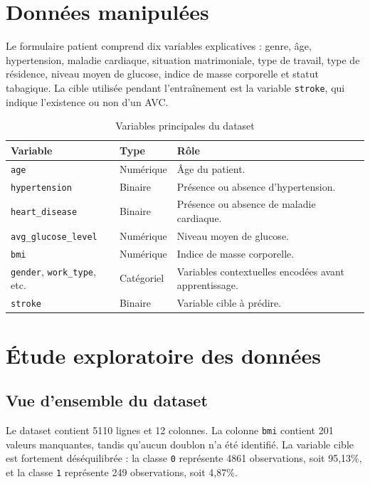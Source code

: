 \documentclass[12pt,a4paper]{report}
\begin{document}
\section{Données manipulées}
Le formulaire patient comprend dix variables explicatives : genre, âge, hypertension, maladie cardiaque, situation matrimoniale, type de travail, type de résidence, niveau moyen de glucose, indice de masse corporelle et statut tabagique. La cible utilisée pendant l'entraînement est la variable \texttt{stroke}, qui indique l'existence ou non d'un AVC.

\begin{table}[H]
\centering
\caption{Variables principales du dataset}
\begin{tabularx}{\textwidth}{p{4cm}p{3cm}X}
\toprule
\textbf{Variable} & \textbf{Type} & \textbf{Rôle}\\
\midrule
\texttt{age} & Numérique & Âge du patient.\\
\texttt{hypertension} & Binaire & Présence ou absence d'hypertension.\\
\texttt{heart\_disease} & Binaire & Présence ou absence de maladie cardiaque.\\
\texttt{avg\_glucose\_level} & Numérique & Niveau moyen de glucose.\\
\texttt{bmi} & Numérique & Indice de masse corporelle.\\
\texttt{gender}, \texttt{work\_type}, etc. & Catégoriel & Variables contextuelles encodées avant apprentissage.\\
\texttt{stroke} & Binaire & Variable cible à prédire.\\
\bottomrule
\end{tabularx}
\end{table}

\section{Étude exploratoire des données}

\subsection{Vue d'ensemble du dataset}
Le dataset contient 5110 lignes et 12 colonnes. La colonne \texttt{bmi} contient 201 valeurs manquantes, tandis qu'aucun doublon n'a été identifié. La variable cible est fortement déséquilibrée : la classe \texttt{0} représente 4861 observations, soit 95,13\%, et la classe \texttt{1} représente 249 observations, soit 4,87\%.
\end{document}
